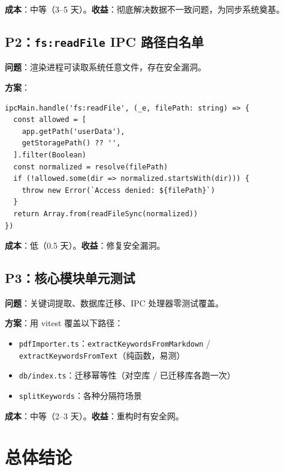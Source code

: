\documentclass[12pt, a4paper]{article}
\begin{document}
\textbf{成本}：中等（3--5 天）。\textbf{收益}：彻底解决数据不一致问题，为同步系统奠基。

\subsection{P2：\texttt{fs:readFile} IPC 路径白名单}

\textbf{问题}：渲染进程可读取系统任意文件，存在安全漏洞。

\textbf{方案}：

\begin{lstlisting}[language={}]
ipcMain.handle('fs:readFile', (_e, filePath: string) => {
  const allowed = [
    app.getPath('userData'),
    getStoragePath() ?? '',
  ].filter(Boolean)
  const normalized = resolve(filePath)
  if (!allowed.some(dir => normalized.startsWith(dir))) {
    throw new Error(`Access denied: ${filePath}`)
  }
  return Array.from(readFileSync(normalized))
})
\end{lstlisting}

\textbf{成本}：低（0.5 天）。\textbf{收益}：修复安全漏洞。

\subsection{P3：核心模块单元测试}

\textbf{问题}：关键词提取、数据库迁移、IPC 处理器零测试覆盖。

\textbf{方案}：用 vitest 覆盖以下路径：
\begin{itemize}[leftmargin=2em, itemsep=2pt]
  \item \texttt{pdfImporter.ts}：\texttt{extractKeywordsFromMarkdown} / \texttt{extractKeywordsFromText}（纯函数，易测）
  \item \texttt{db/index.ts}：迁移幂等性（对空库 / 已迁移库各跑一次）
  \item \texttt{splitKeywords}：各种分隔符场景
\end{itemize}

\textbf{成本}：中等（2--3 天）。\textbf{收益}：重构时有安全网。

\section{总体结论}
\end{document}
